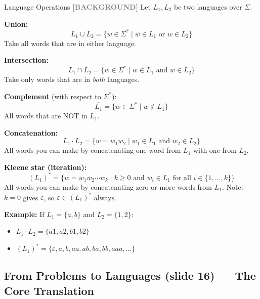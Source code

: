 \documentclass[11pt,a4paper]{article}
\newcommand{\kbg}{\textcolor{gray}{\textbf{[BACKGROUND]}}}
\begin{document}
\begin{definitionbox}{Language Operations \kbg}
Let $L_1, L_2$ be two languages over $\Sigma$.

\textbf{Union:}
$$L_1 \cup L_2 = \{w \in \Sigma^* \mid w \in L_1 \text{ or } w \in L_2\}$$
Take all words that are in either language.

\textbf{Intersection:}
$$L_1 \cap L_2 = \{w \in \Sigma^* \mid w \in L_1 \text{ and } w \in L_2\}$$
Take only words that are in \textit{both} languages.

\textbf{Complement} (with respect to $\Sigma^*$):
$$\overline{L_1} = \{w \in \Sigma^* \mid w \notin L_1\}$$
All words that are NOT in $L_1$.

\textbf{Concatenation:}
$$L_1 \cdot L_2 = \{w = w_1 w_2 \mid w_1 \in L_1 \text{ and } w_2 \in L_2\}$$
All words you can make by concatenating one word from $L_1$ with one from $L_2$.

\textbf{Kleene star (iteration):}
$$(L_1)^* = \{w = w_1 w_2 \cdots w_k \mid k \geq 0 \text{ and } w_i \in L_1 \text{ for all } i \in \{1, \ldots, k\}\}$$
All words you can make by concatenating zero or more words from $L_1$. Note: $k=0$ gives $\varepsilon$, so $\varepsilon \in (L_1)^*$ always.

\textbf{Example:} If $L_1 = \{a, b\}$ and $L_2 = \{1, 2\}$:
\begin{itemize}[nosep]
\item $L_1 \cdot L_2 = \{a1, a2, b1, b2\}$
\item $(L_1)^* = \{\varepsilon, a, b, aa, ab, ba, bb, aaa, \ldots\}$
\end{itemize}
\end{definitionbox}

\subsection{From Problems to Languages (slide 16) --- The Core Translation}
\end{document}
